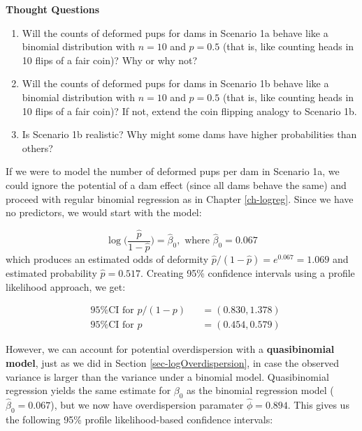 \documentclass[
]{krantz}
\begin{document}
\vspace{5mm}

\textbf{Thought Questions}

\begin{enumerate}
\def\labelenumi{\arabic{enumi}.}
\item
  Will the counts of deformed pups for dams in Scenario 1a behave like a binomial distribution with \(n=10\) and \(p=0.5\) (that is, like counting heads in 10 flips of a fair coin)? Why or why not?
\item
  Will the counts of deformed pups for dams in Scenario 1b behave like a binomial distribution with \(n=10\) and \(p=0.5\) (that is, like counting heads in 10 flips of a fair coin)? If not, extend the coin flipping analogy to Scenario 1b.
\item
  Is Scenario 1b realistic? Why might some dams have higher probabilities than others?
\end{enumerate}

If we were to model the number of deformed pups per dam in Scenario 1a, we could ignore the potential of a dam effect (since all dams behave the same) and proceed with regular binomial regression as in Chapter \ref{ch-logreg}. Since we have no predictors, we would start with the model:

\begin{equation*}
  \log \bigg( \frac{\hat{p}}{1-\hat{p}} \bigg) = \hat{\beta}_0, \textrm{ where } \hat{\beta}_0 = 0.067
\end{equation*}
which produces an estimated odds of deformity \(\widehat{p}/(1-\widehat{p}) = e^{0.067} = 1.069\) and estimated probability \(\widehat{p} = 0.517\). Creating 95\% confidence intervals using a profile likelihood approach, we get:



\[
\begin{alignedat}{2}
  &\textrm{95\% CI for } p/(1-p) &&= (0.830, 1.378) \\
  &\textrm{95\% CI for } p       &&= (0.454, 0.579)
\end{alignedat}
\]

However, we can account for potential overdispersion  with a \textbf{quasibinomial model},  just as we did in Section \ref{sec-logOverdispersion}, in case the observed variance is larger than the variance under a binomial model. Quasibinomial regression yields the same estimate for \(\beta_0\) as the binomial regression model (\(\hat{\beta}_0 = 0.067\)), but we now have overdispersion paramater \(\widehat{\phi} = 0.894\). This gives us the following 95\% profile likelihood-based confidence intervals:
\end{document}
